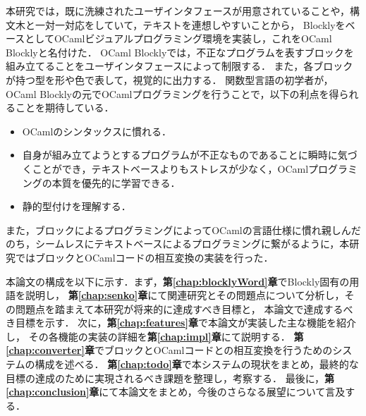 本研究では，既に洗練されたユーザインタフェースが用意されていることや，構文木と一対一対応をしていて，テキストを連想しやすいことから，
BlocklyをベースとしてOCamlビジュアルプログラミング環境を実装し，これをOCaml Blocklyと名付けた．
OCaml Blocklyでは，不正なプログラムを表すブロックを組み立てることをユーザインタフェースによって制限する．
また，各ブロックが持つ型を形や色で表して，視覚的に出力する．%
関数型言語の初学者が，OCaml Blocklyの元でOCamlプログラミングを行うことで，以下の利点を得られることを期待している．
\begin{itemize}
  \item OCamlのシンタックスに慣れる．
  \item 自身が組み立てようとするプログラムが不正なものであることに瞬時に気づくことができ，テキストベースよりもストレスが少なく，OCamlプログラミングの本質を優先的に学習できる．
  \item 静的型付けを理解する．%
\end{itemize}
また，ブロックによるプログラミングによってOCamlの言語仕様に慣れ親しんだのち，シームレスにテキストベースによるプログラミングに繋がるように，本研究ではブロックとOCamlコードの相互変換の実装を行った．

本論文の構成を以下に示す．まず，{\bf 第\ref{chap:blocklyWord}章}でBlockly固有の用語を説明し，
{\bf 第\ref{chap:senko}章}にて関連研究とその問題点について分析し，その問題点を踏まえて本研究が将来的に達成すべき目標と，
本論文で達成するべき目標を示す．
次に，{\bf 第\ref{chap:features}章}で本論文が実装した主な機能を紹介し，
その各機能の実装の詳細を{\bf 第\ref{chap:impl}章}にて説明する．
{\bf 第\ref{chap:converter}章}でブロックとOCamlコードとの相互変換を行うためのシステムの構成を述べる．
{\bf 第\ref{chap:todo}章}で本システムの現状をまとめ，最終的な目標の達成のために実現されるべき課題を整理し，考察する．
最後に，{\bf 第\ref{chap:conclusion}章}にて本論文をまとめ，今後のさらなる展望について言及する．

